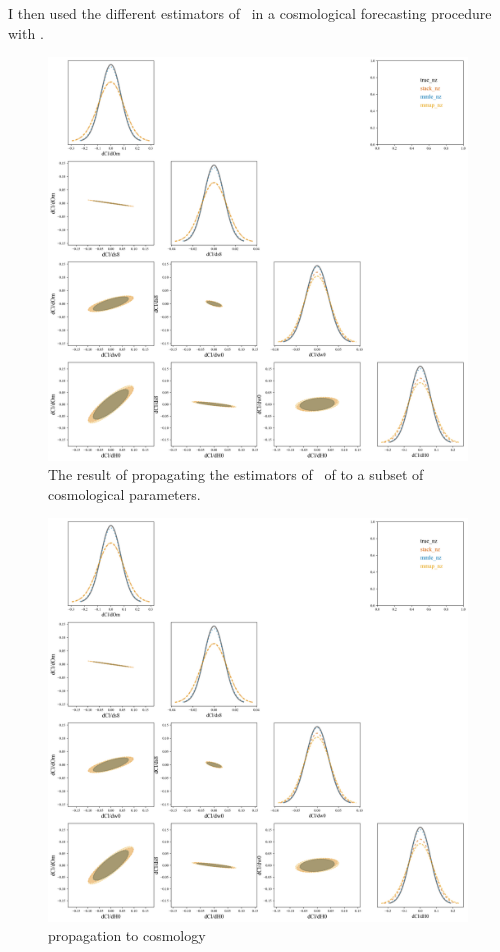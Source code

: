 I then used the different estimators of \nz\ in a cosmological forecasting procedure with \cosmolike.


\begin{figure}
	\begin{center}
		\includegraphics[width=0.99\textwidth]{figures/chippr/final_plot.png}
		\caption{The result of propagating the estimators of \nz\ of  to a subset of cosmological parameters.}
	\end{center}
\end{figure}

\begin{figure}
	\begin{center}
		\includegraphics[width=0.99\textwidth]{figures/chippr/final_plot.png}
		\caption{propagation to cosmology}
	\end{center}
\end{figure}

